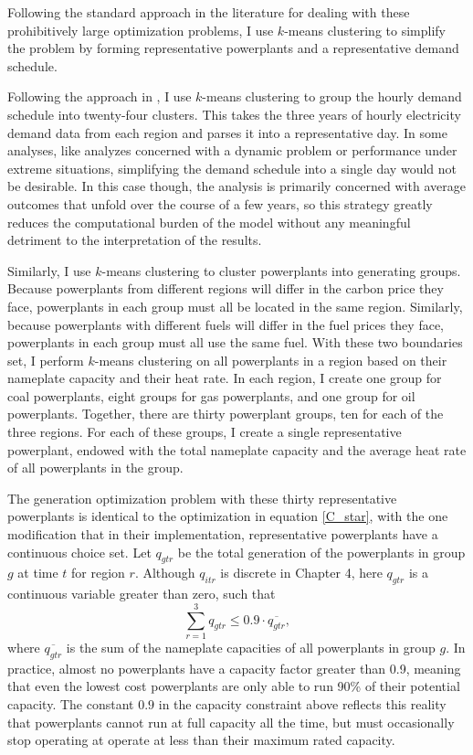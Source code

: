 Following the standard approach in the literature for dealing with these prohibitively large optimization problems, I use $k$-means clustering to simplify the problem by forming representative powerplants and a representative demand schedule. 

Following the approach in \cite{fowlie2021border}, I use $k$-means clustering to group the hourly demand schedule into twenty-four clusters. This takes the three years of hourly electricity demand data from each region and parses it into a representative day. In some analyses, like analyzes concerned with a dynamic problem or performance under extreme situations, simplifying the demand schedule into a single day would not be desirable. In this case though, the analysis is primarily concerned with average outcomes that unfold over the course of a few years, so this strategy greatly reduces the computational burden of the model without any meaningful detriment to the interpretation of the results. 

Similarly, I use $k$-means clustering to cluster powerplants into generating groups. Because powerplants from different regions will differ in the carbon price they face, powerplants in each group must all be located in the same region. Similarly, because powerplants with different fuels will differ in the fuel prices they face, powerplants in each group must all use the same fuel. With these two boundaries set, I perform $k$-means clustering on all powerplants in a region based on their nameplate capacity and their heat rate. In each region, I create one group for coal powerplants, eight groups for gas powerplants, and one group for oil powerplants. Together, there are thirty powerplant groups, ten for each of the three regions. For each of these groups, I create a single representative powerplant, endowed with the total nameplate capacity and the average heat rate of all powerplants in the group. 

The generation optimization problem with these thirty representative powerplants is identical to the optimization in equation \ref{C_star}, with the one modification that in their implementation, representative powerplants have a continuous choice set. Let $q_{gtr}$ be the total generation of the powerplants in group $g$ at time $t$ for region $r$. Although $q_{itr}$ is discrete in Chapter 4, here $q_{gtr}$ is a continuous variable greater than zero, such that
\begin{equation}
    \sum_{r = 1}^3 q_{gtr} \leq 0.9 \cdot \overline{q_{gtr}},
\end{equation} 
where $\overline{q_{gtr}}$ is the sum of the nameplate capacities of all powerplants in group $g$. In practice, almost no powerplants have a capacity factor greater than 0.9, meaning that even the lowest cost powerplants are only able to run 90\% of their potential capacity. The constant $0.9$ in the capacity constraint above reflects this reality that powerplants cannot run at full capacity all the time, but must occasionally stop operating at operate at less than their maximum rated capacity. 

